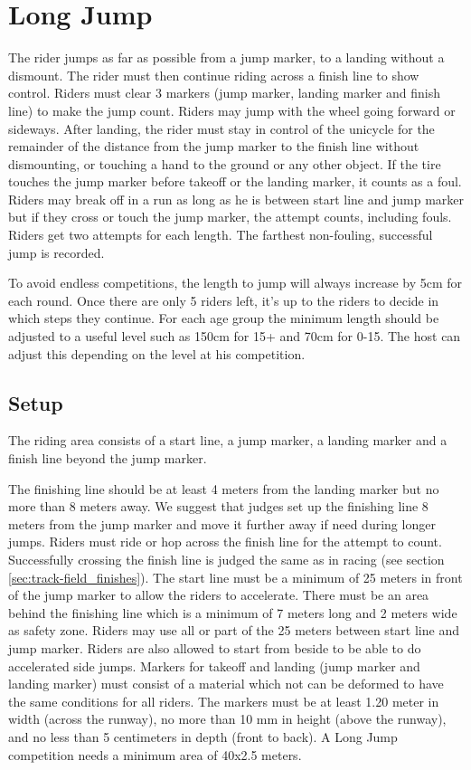 \section{Long Jump}
The rider jumps as far as possible from a jump marker, to a landing without a dismount.
The rider must then continue riding across a finish line to show control.
Riders must clear 3 markers (jump marker, landing marker and finish line) to make the jump count.
Riders may jump with the wheel going forward or sideways.
After landing, the rider must stay in control of the unicycle for the remainder of the distance from the jump marker to the finish line without dismounting, or touching a hand to the ground or any other object.
If the tire touches the jump marker before takeoff or the landing marker, it counts as a foul.
Riders may break off in a run as long as he is between start line and jump marker but if they cross or touch the jump marker, the attempt counts, including fouls.
Riders get two attempts for each length.
The farthest non-fouling, successful jump is recorded.

To avoid endless competitions, the length to jump will always increase by 5cm for each round.
Once there are only 5 riders left, it's up to the riders to decide in which steps they continue.
For each age group the minimum length should be adjusted to a useful level such as 150cm for 15+ and 70cm for 0-15.
The host can adjust this depending on the level at his competition.

\subsection{Setup}
The riding area consists of a start line, a jump marker, a landing marker and a finish line beyond the jump marker.

The finishing line should be at least 4 meters from the landing marker but no more than 8 meters away.
We suggest that judges set up the finishing line 8 meters from the jump marker and move it further away if need during longer jumps.
Riders must ride or hop across the finish line for the attempt to count.
Successfully crossing the finish line is judged the same as in racing (see section \ref{sec:track-field_finishes}).
The start line must be a minimum of 25 meters in front of the jump marker to allow the riders to accelerate.
There must be an area behind the finishing line which is a minimum of 7 meters long and 2 meters wide as safety zone.
Riders may use all or part of the 25 meters between start line and jump marker.
Riders are also allowed to start from beside to be able to do accelerated side jumps.
Markers for takeoff and landing (jump marker and landing marker) must consist of a material which not can be deformed to have the same conditions for all riders.
The markers must be at least 1.20 meter in width (across the runway), no more than 10 mm in height (above the runway), and no less than 5 centimeters in depth (front to back).
A Long Jump competition needs a minimum area of 40x2.5 meters.


